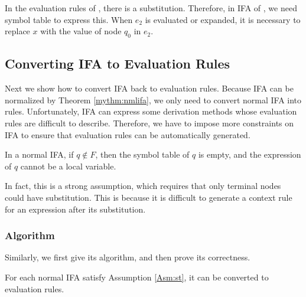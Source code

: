 In the evaluation rules of , there is a substitution. Therefore, in IFA of , we need symbol table to express this. When $e_2$ is evaluated or expanded, it is necessary to replace $x$ with the value of node $q_0$ in $e_2$.




\subsection{Converting IFA to Evaluation Rules}

Next we show how to convert IFA back to evaluation rules. Because IFA can be normalized by Theorem \ref{mythm:nmlifa}, we only need to convert normal IFA into rules. Unfortunately, IFA can express some derivation methods whose evaluation rules are difficult to describe. Therefore, we have to impose more constraints on IFA to ensure that evaluation rules can be automatically generated.

\begin{Asm}
    \label{Asm:st}
    In a normal IFA, if $q \notin F$, then the symbol table of $q$ is empty, and the expression of $q$ cannot be a local variable.
\end{Asm}

In fact, this is a strong assumption, which requires that only terminal nodes could have substitution. This is because it is difficult to generate a context rule for an expression after its substitution.

\subsubsection{Algorithm}

Similarly, we first give its algorithm, and then prove its correctness.

\begin{mythm}
    \label{mythm:ifa2rule}
    For each normal IFA satisfy Assumption \ref{Asm:st}, it can be converted to evaluation rules.
\end{mythm}

